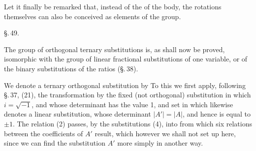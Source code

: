 
Let it finally be remarked that, instead of the  of the
body, the rotations themselves can also be conceived as elements
of the group.

\begin{center}
\S.\,49.

\end{center}

The group of orthogonal ternary substitutions is, as shall
now be proved, isomorphic with the group of linear fractional
substitutions of one variable, or of the binary substitutions of
the ratios (\S.\,38).

We denote a ternary orthogonal substitution
by
To this we first apply, following \S.\,37, (21), the
transformation by the fixed (not orthogonal) substitution
in which $i = \sqrt{-1}$, and whose determinant has the value 1,
and set
in which
likewise denotes a linear substitution, whose determinant
$|A'| = |A|$, and hence is equal to $\pm 1$. The relation
(2) passes, by the substitutions (4), into
from which six relations between the coefficients of $A'$
result, which however we shall not set up here, since we can
find the substitution $A'$ more simply in another way.
